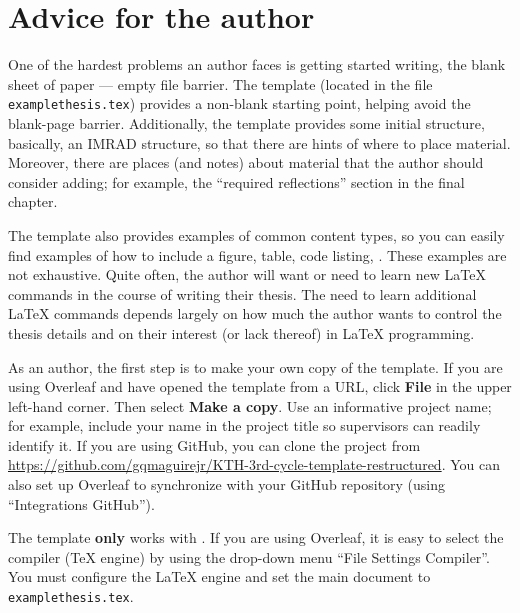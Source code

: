 \documentclass[12pt, twoside]{article}
\newcommand{\ShowDirectoryListing}[1]{%
  \directlua{start_directory_listing("#1")}%
  \begin{footnotesize}%
  \end{footnotesize}%
}
\newcommand{\fname}[1]{\texttt{#1}}
\begin{document}
\cleardoublepage
\tableofcontents
\markboth{\contentsname}{}
\cleardoublepage
\setcounter{page}{1}
\glsresetall  %

\section{Advice for the author}
\label{sec:cycle3authors}
One of the hardest problems an author faces is getting started writing, \ie the blank sheet of paper --- empty file barrier. The template (located in the file \fname{examplethesis.tex}) provides a \mbox{non-blank} starting point, helping avoid the blank-page barrier. Additionally, the template provides some initial structure, basically, an \gls{IMRAD} structure, so that there are hints of where to place material. Moreover, there are places (and notes) about material that the author should consider adding; for example, the \enquote{required reflections} section in the final chapter.

The template also provides examples of common content types, so you can easily find examples of how to include a figure, table, code listing, \etc. These examples are not exhaustive. Quite often, the author will want or need to learn new \LaTeX{} commands in the course of writing their thesis. The need to learn additional \LaTeX{} commands depends largely on how much the author wants to control the thesis details and on their interest (or lack thereof) in \LaTeX{} programming.

As an author, the first step is to make your own copy of the template.
If you are using Overleaf and have opened the template from a \gls{URL}, click \textbf{File} in the upper left-hand corner. Then select \textbf{Make a copy}. Use an informative project name; for example, include your name in the project title so supervisors can readily identify it. If you are using GitHub, you can clone the project from \url{https://github.com/gqmaguirejr/KTH-3rd-cycle-template-restructured}. You can also set up Overleaf to synchronize with your GitHub repository (using \enquote{Integrations \textrightarrow{} GitHub}).

The template \textbf{only} works with \LuaLaTeX. 
If you are using Overleaf, it is easy to select the compiler (\ie \TeX{} engine) by using the drop-down menu \enquote{File \textrightarrow{} Settings \textrightarrow{} Compiler}. You must configure the \LaTeX{} engine and set the main document to \fname{examplethesis.tex}.
\end{document}
